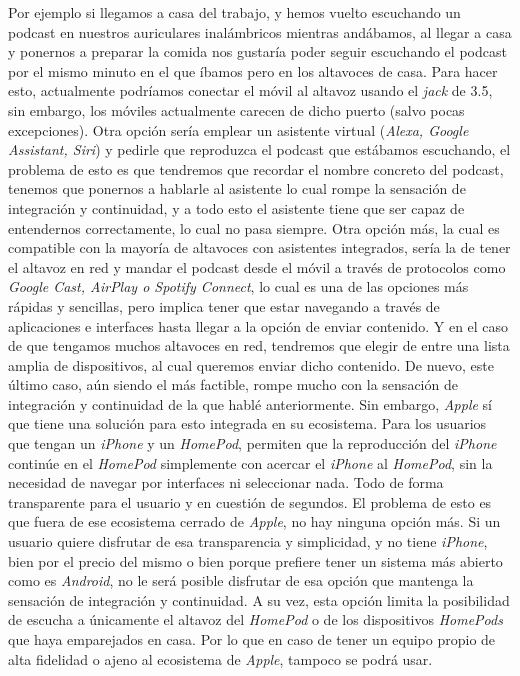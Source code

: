 Por ejemplo si llegamos a casa del trabajo, y hemos vuelto escuchando un podcast en nuestros auriculares inalámbricos mientras andábamos, al llegar a casa y ponernos a preparar la comida nos gustaría poder seguir escuchando el podcast por el mismo minuto en el que íbamos pero en los altavoces de casa. Para hacer esto, actualmente podríamos conectar el móvil al altavoz usando el \emph{jack} de 3.5, sin embargo, los móviles actualmente carecen de dicho puerto (salvo pocas excepciones). Otra opción sería emplear un asistente virtual (\emph{Alexa, Google Assistant, Siri}) y pedirle que reproduzca el podcast que estábamos escuchando, el problema de esto es que tendremos que recordar el nombre concreto del podcast, tenemos que ponernos a hablarle al asistente lo cual rompe la sensación de integración y continuidad, y a todo esto el asistente tiene que ser capaz de entendernos correctamente, lo cual no pasa siempre. Otra opción más, la cual es compatible con la mayoría de altavoces con asistentes integrados, sería la de tener el altavoz en red y mandar el podcast desde el móvil a través de protocolos como \emph{Google Cast, AirPlay o Spotify Connect}, lo cual es una de las opciones más rápidas y sencillas, pero implica tener que estar navegando a través de aplicaciones e interfaces hasta llegar a la opción de enviar contenido. Y en el caso de que tengamos muchos altavoces en red, tendremos que elegir de entre una lista amplia de dispositivos, al cual queremos enviar dicho contenido. De nuevo, este último caso, aún siendo el más factible, rompe mucho con la sensación de integración y continuidad de la que hablé anteriormente. Sin embargo, \emph{Apple} sí que tiene una solución para esto integrada en su ecosistema. Para los usuarios que tengan un \emph{iPhone} y un \emph{HomePod}, permiten que la reproducción del \emph{iPhone} continúe en el \emph{HomePod} simplemente con acercar el \emph{iPhone} al \emph{HomePod}, sin la necesidad de navegar por interfaces ni seleccionar nada. Todo de forma transparente para el usuario y en cuestión de segundos. El problema de esto es que fuera de ese ecosistema cerrado de \emph{Apple}, no hay ninguna opción más. Si un usuario quiere disfrutar de esa transparencia y simplicidad, y no tiene \emph{iPhone}, bien por el precio del mismo o bien porque prefiere tener un sistema más abierto como es \emph{Android}, no le será posible disfrutar de esa opción que mantenga la sensación de integración y continuidad. A su vez, esta opción limita la posibilidad de escucha a únicamente el altavoz del \emph{HomePod} o de los dispositivos \emph{HomePods} que haya emparejados en casa. Por lo que en caso de tener un equipo propio de alta fidelidad o ajeno al ecosistema de \emph{Apple}, tampoco se podrá usar.\\

